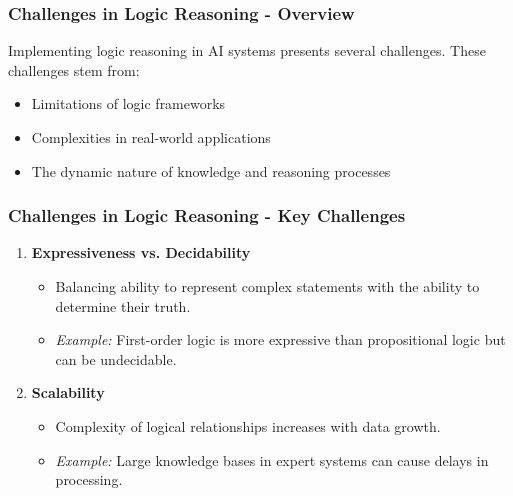 \documentclass[aspectratio=169]{beamer}
\begin{document}
\begin{frame}[fragile]
    \frametitle{Challenges in Logic Reasoning - Overview}
    Implementing logic reasoning in AI systems presents several challenges. 
    These challenges stem from:
    \begin{itemize}
        \item Limitations of logic frameworks
        \item Complexities in real-world applications
        \item The dynamic nature of knowledge and reasoning processes
    \end{itemize}
\end{frame}

\begin{frame}[fragile]
    \frametitle{Challenges in Logic Reasoning - Key Challenges}
    \begin{enumerate}
        \item \textbf{Expressiveness vs. Decidability}
            \begin{itemize}
                \item Balancing ability to represent complex statements with the ability to determine their truth.
                \item \textit{Example:} First-order logic is more expressive than propositional logic but can be undecidable.
            \end{itemize}

        \item \textbf{Scalability}
            \begin{itemize}
                \item Complexity of logical relationships increases with data growth.
                \item \textit{Example:} Large knowledge bases in expert systems can cause delays in processing.
            \end{itemize}
    \end{enumerate}
\end{frame}
\end{document}
